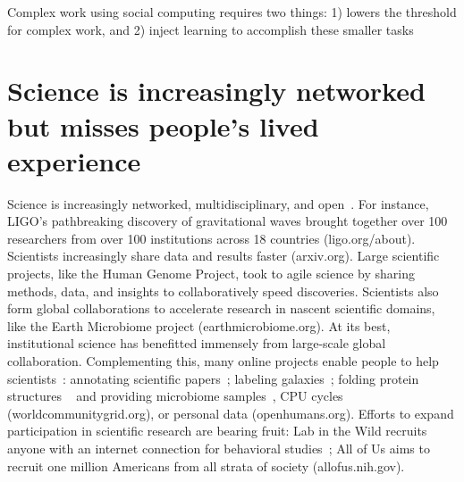 Complex work using social computing requires two things:
1) lowers the threshold for complex work, and 
2) inject learning to accomplish these smaller tasks

\section{Science is increasingly networked but misses people’s lived experience }
Science is increasingly networked, multidisciplinary, and
open~\cite{Pandey2017}. For instance, LIGO’s pathbreaking discovery of
gravitational waves brought together over 100 researchers
from over 100 institutions across 18 countries (ligo.org/about). 
Scientists increasingly share data and results faster (arxiv.org). 
Large scientific projects, like the Human Genome Project, 
took to agile science by sharing methods, data, and insights to 
collaboratively speed discoveries. Scientists also form global 
collaborations to accelerate research in nascent scientific domains, 
like the Earth Microbiome project (earthmicrobiome.org).
At its best, institutional science has benefitted immensely
from large-scale global collaboration. Complementing this,
many online projects enable people to help scientists~\cite{Nielsen2012}: annotating 
scientific papers~\cite{Good2013}; labeling galaxies~\cite{JordanRaddick2013}; 
folding protein structures ~\cite{Cooper2010} and providing microbiome 
samples~\cite{McDonald2018}, CPU cycles (worldcommunitygrid.org), or 
personal data (openhumans.org). 
Efforts to expand participation in scientific research are bearing fruit: Lab in the Wild 
recruits anyone with an internet connection for behavioral studies~\cite{Reinecke2015}; All of Us aims 
to recruit one million Americans from all strata of society (allofus.nih.gov). 

